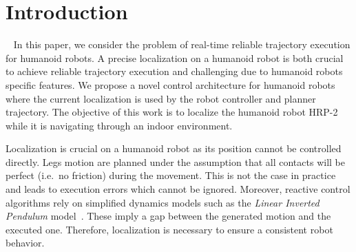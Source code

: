\section{Introduction}~\label{sec:introduction}
In this paper, we consider the problem of real-time reliable trajectory execution for humanoid robots. A precise localization on a
humanoid robot is both crucial to achieve reliable trajectory execution and challenging due to humanoid robots specific features. We
propose a novel control architecture for humanoid robots where the current localization is used by the robot controller and planner
trajectory. The objective of this work is to localize the humanoid robot HRP-2~\cite{Kaneko04icra} while it is navigating through an indoor environment.

Localization is crucial on a humanoid robot as its position cannot be controlled directly. Legs motion are planned under the assumption that
all contacts will be perfect (i.e.\ no friction) during the movement. This is not the case in practice and leads to execution
errors which cannot be ignored. Moreover, reactive control algorithms rely on simplified dynamics models such as the \textit{Linear Inverted Pendulum} model~\cite{Kajita01iros}. These imply a gap between the generated motion and the executed one. Therefore, localization is necessary to ensure a consistent robot behavior.

